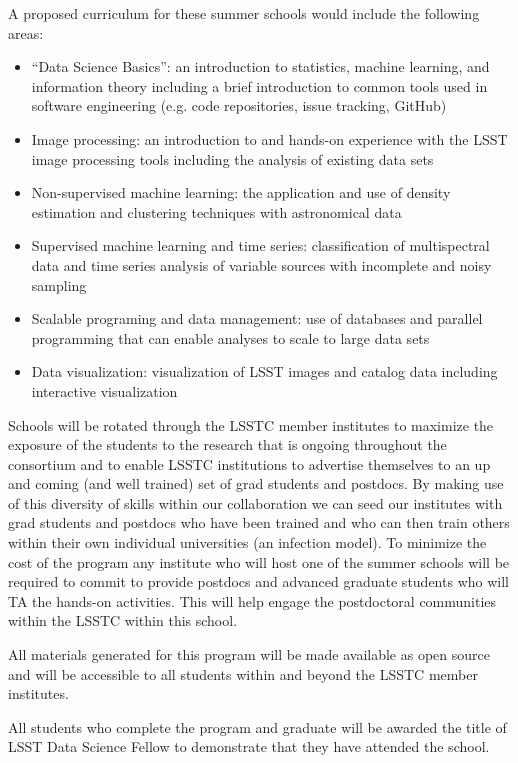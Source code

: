\documentclass[nofootbib,floatfix,11pt]{article}
\begin{document}
A proposed curriculum for these summer schools would include the following areas: 

\begin{itemize}
\item “Data Science Basics”: an introduction to statistics, machine learning, and information theory including a brief introduction to common tools used in software engineering (e.g. code repositories, issue tracking, GitHub)
\item Image processing: an introduction to and hands-on experience with the LSST image processing tools including the analysis of existing data sets
\item Non-supervised machine learning: the application and use of density estimation and clustering techniques with astronomical data
\item Supervised machine learning and time series: classification of multispectral data and time series analysis of variable sources with incomplete and noisy sampling
\item Scalable programing and data management: use of databases and parallel programming that can enable analyses to scale to large data sets
\item Data visualization: visualization of LSST images and catalog data including interactive visualization
\end{itemize}

Schools will be rotated through the LSSTC member institutes to maximize the exposure of the students to the research that is ongoing throughout the consortium and to enable LSSTC institutions to advertise themselves to an up and coming (and well trained) set of grad students and postdocs. By making use of this diversity of skills within our collaboration we can seed our institutes with grad students and postdocs who have been trained and who can then train others within their own individual universities (an infection model). To minimize the cost of the program any institute who will host one of the summer schools will be required to commit to provide postdocs and advanced graduate students who will TA the hands-on activities. This will help engage the postdoctoral communities within the LSSTC within this school. 

All materials generated for this program will be made available as open source and will be accessible to all students within and beyond the LSSTC member institutes.

All students who complete the program and graduate will be awarded the title of LSST Data Science Fellow to demonstrate that they have attended the school.
\end{document}
